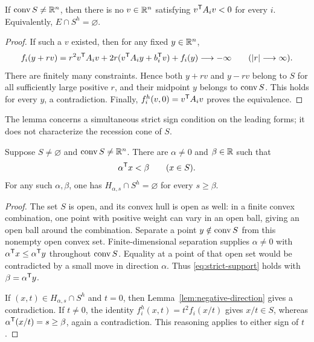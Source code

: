 \begin{lemma}
\label{lem:negative-direction}
If $\operatorname{conv} S\ne\mathbb R^n$, then there is no $v\in\mathbb R^n$ satisfying
$v^{\mathsf T} A_i v<0$ for every $i$. Equivalently, $E\cap S^h=\varnothing$.
\end{lemma}
\begin{proof}
If such a $v$ existed, then for any fixed $y\in\mathbb R^n$,
\[
 f_i(y+rv)=r^2v^{\mathsf T} A_i v
       +2r(v^{\mathsf T} A_i y+b_i^{\mathsf T} v)+f_i(y)
       \longrightarrow-\infty\qquad (|r|\longrightarrow\infty).
\]
There are finitely many constraints. Hence both $y+rv$ and $y-rv$
belong to $S$ for all sufficiently large positive $r$, and their midpoint
$y$ belongs to $\operatorname{conv} S$. This holds for every $y$, a contradiction.
Finally, $f_i^h(v,0)=v^{\mathsf T} A_i v$ proves the equivalence.
\end{proof}

The lemma concerns a simultaneous strict sign condition on the leading
forms; it does not characterize the recession cone of $S$.

\begin{lemma}\label{lem:sweeping}
Suppose $S\ne\varnothing$ and $\operatorname{conv} S\ne\mathbb R^n$. There are
$\alpha\ne0$ and $\beta\in\mathbb R$ such that
\begin{equation}\label{eq:strict-support}
 \alpha^{\mathsf T} x<\beta\qquad(x\in S).
\end{equation}
For any such $\alpha,\beta$, one has
$H_{\alpha,s}\cap S^h=\varnothing$ for every $s\geq\beta$.
\end{lemma}
\begin{proof}
The set $S$ is open, and its convex hull is open as well: in a finite
convex combination, one point with positive weight can vary in an open
ball, giving an open ball around the combination. Separate a point
$y\notin\operatorname{conv} S$ from this nonempty open convex set. Finite-dimensional
separation supplies $\alpha\ne0$ with
$\alpha^{\mathsf T} x\leq\alpha^{\mathsf T} y$ throughout $\operatorname{conv} S$.
Equality at a point of that open set would be contradicted by a small
move in direction $\alpha$. Thus \eqref{eq:strict-support} holds with
$\beta=\alpha^{\mathsf T} y$.

If $(x,t)\in H_{\alpha,s}\cap S^h$ and $t=0$, then
Lemma~\ref{lem:negative-direction} gives a contradiction. If $t\ne0$,
the identity $f_i^h(x,t)=t^2f_i(x/t)$ gives $x/t\in S$, whereas
$\alpha^{\mathsf T}(x/t)=s\geq\beta$, again a contradiction.
This reasoning applies to either sign of $t$.
\end{proof}

